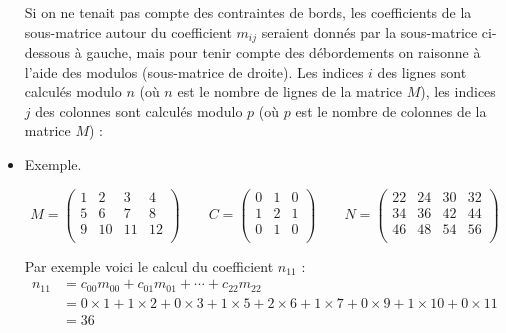 \documentclass[11pt,class=report,crop=false]{standalone}
\begin{document}
\begin{cours}
\begin{itemize}

Si on ne tenait pas compte des contraintes de bords, les coefficients de la sous-matrice autour du coefficient $m_{ij}$ seraient donnés par la sous-matrice ci-dessous à gauche, mais pour tenir compte des débordements on raisonne à l'aide des modulos (sous-matrice de droite). Les indices $i$ des lignes sont calculés modulo $n$ (où $n$ est le nombre de lignes de la matrice $M$), les indices $j$ des colonnes sont calculés modulo $p$ (où $p$ est le nombre de colonnes de la matrice $M$)  :


\item Exemple.

$$M = \begin{pmatrix}
1&2&3&4\\5&6&7&8\\9&10&11&12\\
\end{pmatrix}\qquad
C = \begin{pmatrix}
0&1&0\\1&2&1\\0&1&0\\
\end{pmatrix}\qquad
N = \begin{pmatrix}
22 & 24 & 30 & 32 \\ 
34 & 36 & 42 & 44 \\ 
46 & 48 & 54 & 56 \\
\end{pmatrix}$$

\smallskip

Par exemple voici le calcul du coefficient $n_{11}$ :
\begin{align*}
n_{11} 
& = c_{00}m_{00} + c_{01}m_{01} + \cdots + c_{22}m_{22} \\
& = 0\times 1 + 1\times 2 + 0 \times 3 
+ 1\times 5 + 2\times 6 + 1 \times 7   
+ 0\times 9 + 1\times 10 + 0 \times 11 \\
& = 36
\end{align*}

\end{itemize}
\end{cours}

\end{document}
